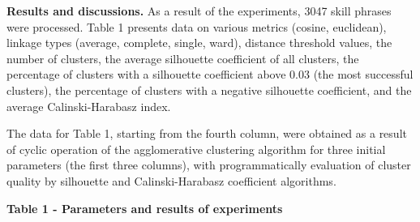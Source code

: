 {\bfseries Results and discussions.} As a result of the experiments, 3047
skill phrases were processed. Table 1 presents data on various metrics
(cosine, euclidean), linkage types (average, complete, single, ward),
distance threshold values, the number of clusters, the average
silhouette coefficient of all clusters, the percentage of clusters with
a silhouette coefficient above 0.03 (the most successful clusters), the
percentage of clusters with a negative silhouette coefficient, and the
average Calinski-Harabasz index.

The data for Table 1, starting from the fourth column, were obtained as
a result of cyclic operation of the agglomerative clustering algorithm
for three initial parameters (the first three columns), with
programmatically evaluation of cluster quality by silhouette and
Calinski-Harabasz coefficient algorithms.

{\bfseries Table 1 - Parameters and results of experiments}

